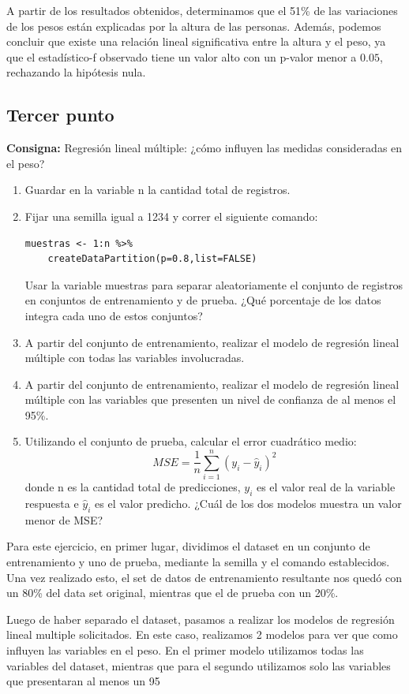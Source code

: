 \documentclass{article} %
\begin{document}
A partir de los resultados obtenidos, determinamos que el 51\% de las variaciones de los pesos están explicadas por la altura de las personas. Además, podemos concluir que existe una relación lineal significativa entre la altura y el peso, ya que el estadístico-f observado tiene un valor alto con un p-valor menor a $0.05$, rechazando la hipótesis nula.

\subsection{Tercer punto}

\textbf{Consigna:} Regresión lineal múltiple: ¿cómo influyen las medidas consideradas en el peso?

\begin{enumerate}[label=(\alph*)]
\item Guardar en la variable n la cantidad total de registros.
\item Fijar una semilla igual a 1234 y correr el siguiente comando:
\begin{lstlisting}
muestras <- 1:n %>%
	createDataPartition(p=0.8,list=FALSE)
\end{lstlisting}
Usar la variable muestras para separar aleatoriamente el conjunto de registros en conjuntos de entrenamiento y de prueba. ¿Qué porcentaje de los datos integra cada uno de estos conjuntos?
\item A partir del conjunto de entrenamiento, realizar el modelo de regresión lineal múltiple con todas las variables involucradas.
\item A partir del conjunto de entrenamiento, realizar el modelo de regresión lineal múltiple con las variables que presenten un nivel de confianza de al menos el 95\%.
\item Utilizando el conjunto de prueba, calcular el error cuadrático medio:
$$
MSE=\frac{1}{n}\sum^n_{i=1}(y_i-\hat{y}_i)^2
$$
donde n es la cantidad total de predicciones, $y_i$ es el valor real de la variable respuesta e $\hat{y}_i$ es el valor predicho. ¿Cuál de los dos modelos muestra un valor menor de MSE?
\end{enumerate}

Para este ejercicio, en primer lugar, dividimos el dataset en un conjunto de entrenamiento y uno de prueba, mediante la semilla y el comando establecidos. Una vez realizado esto, el set de datos de entrenamiento resultante nos quedó con un 80\%  del data set original, mientras que el de prueba con un 20\%.

Luego de haber separado el dataset, pasamos a realizar los modelos de regresión lineal multiple solicitados. En este caso, realizamos 2 modelos para ver que como influyen las variables en el peso. En el primer modelo utilizamos todas las variables del dataset, mientras que para el segundo utilizamos solo las variables que presentaran al menos un 95%
\end{document}
